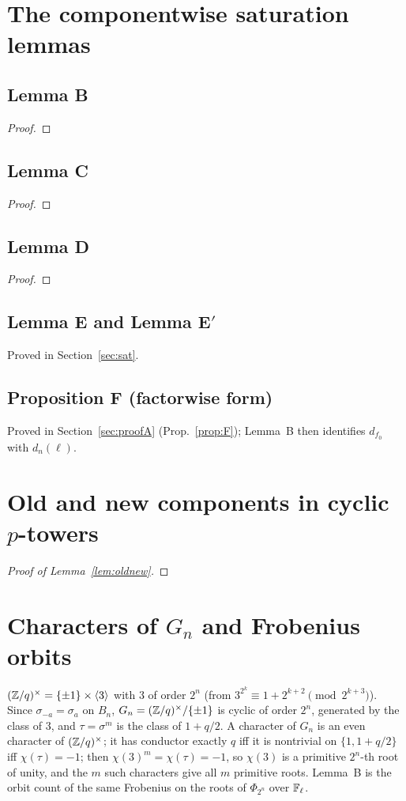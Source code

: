 \documentclass[11pt]{amsart}
\theoremstyle{remark}\newtheorem{remark}[theorem]{Remark}
\theoremstyle{definition}\newtheorem{definition}[theorem]{Definition}
\providecommand{\proofsdir}{../../proofs} %
\begin{document}
\appendix
\section{The componentwise saturation lemmas}\label{app:A}
\subsection*{Lemma B}
\begin{proof}

\end{proof}
\subsection*{Lemma C}
\begin{proof}

\end{proof}
\subsection*{Lemma D}
\begin{proof}

\end{proof}
\subsection*{Lemma E and Lemma E$'$}
Proved in Section~\ref{sec:sat}.
\subsection*{Proposition F (factorwise form)}
Proved in Section~\ref{sec:proofA} (Prop.~\ref{prop:F}); Lemma~B then identifies $d_{f_0}$ with $d_n(\ell)$.

\section{Old and new components in cyclic $p$-towers}\label{app:B}
\begin{proof}[Proof of Lemma~\ref{lem:oldnew}]

\end{proof}

\section{Characters of $G_n$ and Frobenius orbits}\label{app:C}
$(\mathbb{Z}/q)^\times=\{\pm1\}\times\langle3\rangle$ with $3$ of order $2^n$ (from $3^{2^k}\equiv1+2^{k+2}\pmod{2^{k+3}}$). Since $\sigma_{-a}=\sigma_a$ on $B_n$, $G_n=(\mathbb{Z}/q)^\times/\{\pm1\}$ is cyclic of order $2^n$, generated by the class of $3$, and $\tau=\sigma^{m}$ is the class of $1+q/2$. A character of $G_n$ is an even character of $(\mathbb{Z}/q)^\times$; it has conductor exactly $q$ iff it is nontrivial on $\{1,1+q/2\}$ iff $\chi(\tau)=-1$; then $\chi(3)^m=\chi(\tau)=-1$, so $\chi(3)$ is a primitive $2^n$-th root of unity, and the $m$ such characters give all $m$ primitive roots. Lemma~B is the orbit count of the same Frobenius on the roots of $\Phi_{2^n}$ over $\mathbb{F}_\ell$.
\end{document}
